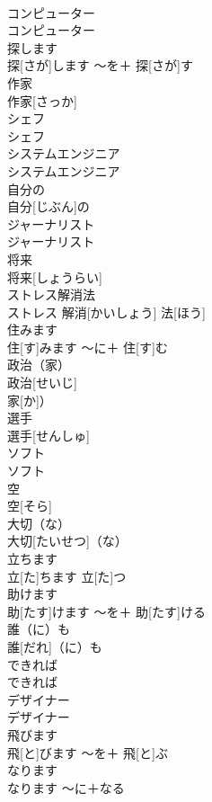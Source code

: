 \documentclass[8pt]{extreport}
\begin{document}
\begin{CJK}{UTF8}{min}
\\	コンピューター	
\\	コンピューター		
\\	探します	
\\	探[さが]します	〜を＋ 探[さが]す	
\\	作家	
\\	作家[さっか]		
\\	シェフ	
\\	シェフ		
\\	システムエンジニア	
\\	システムエンジニア		
\\	自分の	
\\	自分[じぶん]の		
\\	ジャーナリスト	
\\	ジャーナリスト		
\\	将来	
\\	将来[しょうらい]		
\\	ストレス解消法	
\\	ストレス 解消[かいしょう] 法[ほう]		
\\	住みます	
\\	住[す]みます	〜に＋ 住[す]む	
\\	政治（家）	
\\	政治[せいじ]
\\	家[か]）		
\\	選手	
\\	選手[せんしゅ]		
\\	ソフト	
\\	ソフト		
\\	空	
\\	空[そら]		
\\	大切（な）	
\\	大切[たいせつ]（な）		
\\	立ちます	
\\	立[た]ちます	立[た]つ	
\\	助けます	
\\	助[たす]けます	〜を＋ 助[たす]ける	
\\	誰（に）も	
\\	誰[だれ]（に）も		
\\	できれば	
\\	できれば		
\\	デザイナー	
\\	デザイナー		
\\	飛びます	
\\	飛[と]びます	〜を＋ 飛[と]ぶ	
\\	なります	
\\	なります	〜に＋なる	

\end{CJK}
\end{document}
